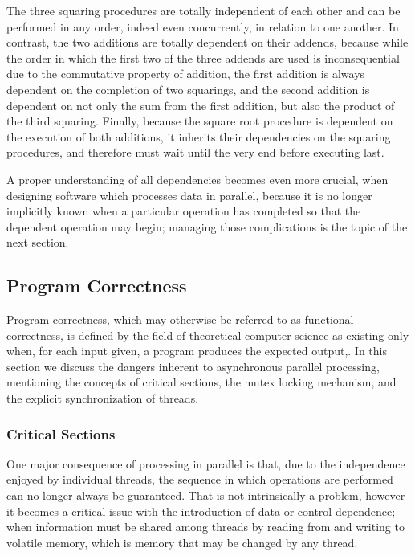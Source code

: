 The three squaring procedures are totally independent of each other and can be performed in any order, indeed even concurrently, in relation to one another. In contrast, the two additions are totally dependent on their addends, because while the order in which the first two of the three addends are used is inconsequential due to the commutative property of addition, the first addition is always dependent on the completion of two squarings, and the second addition is dependent on not only the sum from the first addition, but also the product of the third squaring. Finally, because the square root procedure is dependent on the execution of both additions, it inherits their dependencies on the squaring procedures, and therefore must wait until the very end before executing last.

A proper understanding of all dependencies becomes even more crucial, when designing software which processes data in parallel, because it is no longer implicitly known when a particular operation has completed so that the dependent operation may begin; managing those complications is the topic of the next section.

%
%
%
%
\subsection{Program Correctness}
Program correctness, which may otherwise be referred to as functional correctness, is defined by the field of theoretical computer science as existing only when, for each input given, a program produces the expected output,. In this section we discuss the dangers inherent to asynchronous parallel processing, mentioning the concepts of critical sections, the mutex locking mechanism, and the explicit synchronization of threads.

%
%
\subsubsection{Critical Sections}
One major consequence of processing in parallel is that, due to the independence enjoyed by individual threads, the sequence in which operations are performed can no longer always be guaranteed. That is not intrinsically a problem, however it becomes a critical issue with the introduction of data or control dependence; when information must be shared among threads by reading from and writing to volatile memory, which is memory that may be changed by any thread.

